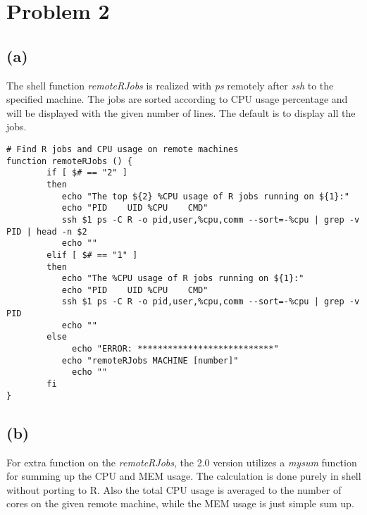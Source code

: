 \documentclass{article}
\begin{document}



\newpage

\section*{Problem 2}
\subsection*{(a)}

The shell function \textit{remoteRJobs} is realized with \textit{ps} remotely after \textit{ssh} to the
specified machine. The jobs are sorted according to CPU usage percentage and will be displayed with the given number of lines. The default is to display all the jobs.

\begin{lstlisting}
# Find R jobs and CPU usage on remote machines
function remoteRJobs () {
		if [ $# == "2" ]
		then 
		   echo "The top ${2} %CPU usage of R jobs running on ${1}:" 
		   echo "PID	UID	%CPU	CMD"
		   ssh $1 ps -C R -o pid,user,%cpu,comm --sort=-%cpu | grep -v PID | head -n $2
		   echo ""
		elif [ $# == "1" ]
		then 
		   echo "The %CPU usage of R jobs running on ${1}:" 
		   echo "PID	UID	%CPU	CMD"
		   ssh $1 ps -C R -o pid,user,%cpu,comm --sort=-%cpu | grep -v PID
		   echo ""
		else
			 echo "ERROR: ***************************"
		   echo "remoteRJobs MACHINE [number]"
			 echo ""
		fi 
}
\end{lstlisting}


\subsection*{(b)}

For extra function on the \textit{remoteRJobs}, the 2.0 version utilizes a \textit{mysum} function for summing up the CPU and MEM usage. The calculation is done purely in shell without porting to R. Also the total CPU usage is averaged to the number of cores on the given remote machine, while the MEM usage is just simple sum up.
\end{document}
